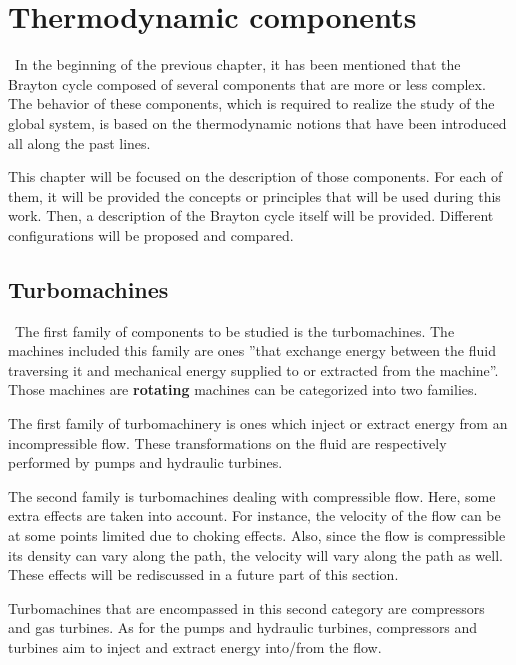 \graphicspath{{Chapitre_4/Images/}}
\chapter{Thermodynamic components}\label{C4}
\quad\ In the beginning of the previous chapter, it has been mentioned that the Brayton cycle composed of several components that are more or less complex. The behavior of these components, which is required to realize the study of the global system, is based on the thermodynamic notions that have been introduced all along the past lines.

This chapter will be focused on the description of those components. For each of them, it will be provided the concepts or principles that will be used during this work. Then, a description of the Brayton cycle itself will be provided. Different configurations will be proposed and compared.
\section{Turbomachines}
\quad\ The first family of components to be studied is the turbomachines. The machines included this family are ones ''that exchange energy between the
fluid traversing it and mechanical energy supplied to or extracted from the machine''\cite{Hillewaert2019}. Those machines are \textbf{rotating} machines
can be categorized into two families.

The first family of turbomachinery is ones which inject or extract energy from an incompressible flow. These transformations on the fluid  are respectively performed by pumps and hydraulic turbines.

The second family is turbomachines dealing with compressible flow. Here, some extra effects are taken into account. For instance, the velocity of the flow can be at some points limited due to choking effects. Also, since the flow is compressible its density can vary along the path, the velocity will vary along the path as well. These effects will be rediscussed in a future part of this section.

Turbomachines that are encompassed in this second category are compressors and gas turbines. As for the pumps and hydraulic turbines, compressors and turbines aim to inject and extract energy into/from the flow.

